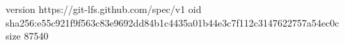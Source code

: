 version https://git-lfs.github.com/spec/v1
oid sha256:e55c921f9f563c83e9692dd84b1c4435a01b44e3c7f112c3147622757a54ec0c
size 87540
